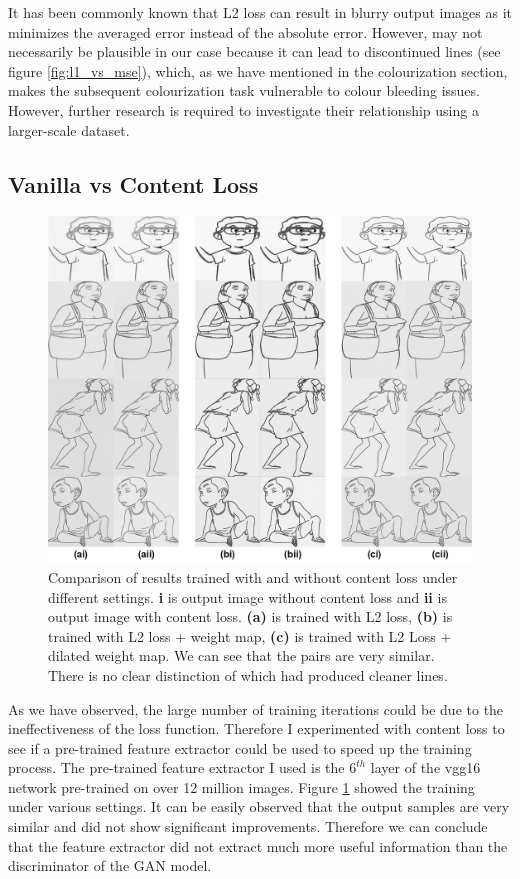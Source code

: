It has been commonly known that L2 loss can result in blurry output images as it minimizes the averaged error instead of the absolute error\cite{isolaImagetoImageTranslationConditional2018}. However, may not necessarily be plausible in our case because it can lead to discontinued lines (see figure \ref{fig:l1_vs_mse}), which, as we have mentioned in the colourization section, makes the subsequent colourization task vulnerable to colour bleeding issues. However, further research is required to investigate their relationship using a larger-scale dataset.

\subsection{Vanilla vs Content Loss}
\begin{figure}
    \centering
    \includegraphics[width=1.0\textwidth]{images/sketch/content_loss_compare.png}
    \caption[Comparison of results trained with and without content loss under different settings.]{Comparison of results trained with and without content loss under different settings. \textbf{i} is output image without content loss and \textbf{ii} is output image with content loss. \textbf{(a)} is trained with L2 loss, \textbf{(b)} is trained with L2 loss + weight map, \textbf{(c)} is trained with L2 Loss + dilated weight map. We can see that the pairs are very similar. There is no clear distinction of which had produced cleaner lines.}
    \label{fig:content_loss_compare}
\end{figure}
As we have observed, the large number of training iterations could be due to the ineffectiveness of the loss function. Therefore I experimented with content loss to see if a pre-trained feature extractor could be used to speed up the training process. The pre-trained feature extractor I used is the $6^{th}$ layer of the vgg16 network pre-trained on over 12 million images. Figure \ref{fig:content_loss_compare} showed the training under various settings. It can be easily observed that the output samples are very similar and did not show significant improvements. Therefore we can conclude that the feature extractor did not extract much more useful information than the discriminator of the GAN model.


